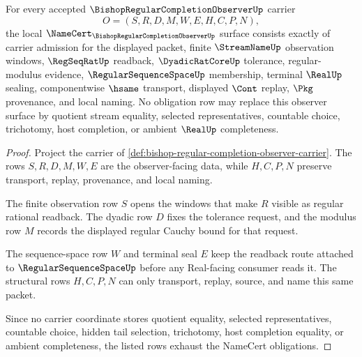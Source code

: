 \begin{theorem}
\label{thm:bishop-regular-completion-observer-namecert-obligations}
For every accepted $\BishopRegularCompletionObserverUp$ carrier
$$
O=(S,R,D,M,W,E,H,C,P,N),
$$
the local $\NameCert_{\BishopRegularCompletionObserverUp}$ surface consists exactly of carrier admission for the displayed packet, finite $\StreamNameUp$ observation windows, $\RegSeqRatUp$ readback, $\DyadicRatCoreUp$ tolerance, regular-modulus evidence, $\RegularSequenceSpaceUp$ membership, terminal $\RealUp$ sealing, componentwise $\hsame$ transport, displayed $\Cont$ replay, $\Pkg$ provenance, and local naming. No obligation row may replace this observer surface by quotient stream equality, selected representatives, countable choice, trichotomy, host completion, or ambient $\RealUp$ completeness.
\end{theorem}
\begin{proof}
Project the carrier of \autoref{def:bishop-regular-completion-observer-carrier}. The rows $S,R,D,M,W,E$ are the observer-facing data, while $H,C,P,N$ preserve transport, replay, provenance, and local naming.

The finite observation row $S$ opens the windows that make $R$ visible as regular rational readback. The dyadic row $D$ fixes the tolerance request, and the modulus row $M$ records the displayed regular Cauchy bound for that request.

The sequence-space row $W$ and terminal seal $E$ keep the readback route attached to $\RegularSequenceSpaceUp$ before any Real-facing consumer reads it. The structural rows $H,C,P,N$ can only transport, replay, source, and name this same packet.

Since no carrier coordinate stores quotient equality, selected representatives, countable choice, hidden tail selection, trichotomy, host completion equality, or ambient completeness, the listed rows exhaust the NameCert obligations.
\end{proof}

